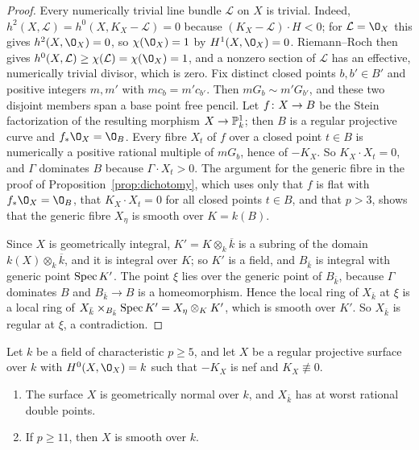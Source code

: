 \begin{proof}
Every numerically trivial line bundle $\mathcal L$ on $X$ is trivial.
Indeed, $h^2(X,\mathcal L) = h^0(X,K_X-\mathcal L) = 0$ because $(K_X-\mathcal L)\cdot H<0$; for $\mathcal L = \O_X$ this gives $h^2(X,\O_X) = 0$, so $\chi(\O_X) = 1$ by $H^1(X,\O_X) = 0$.
Riemann--Roch then gives $h^0(X,\mathcal L)\geq\chi(\mathcal L) = \chi(\O_X) = 1$, and a nonzero section of $\mathcal L$ has an effective, numerically trivial divisor, which is zero.
Fix distinct closed points $b,b'\in B'$ and positive integers $m,m'$ with $mc_b = m'c_{b'}$.
Then $mG_b\sim m'G_{b'}$, and these two disjoint members span a base point free pencil.
Let $f\colon X\to B$ be the Stein factorization of the resulting morphism $X\to\mathbb{P}^1_k$; then $B$ is a regular projective curve and $f_*\O_X = \O_B$.
Every fibre $X_t$ of $f$ over a closed point $t\in B$ is numerically a positive rational multiple of $mG_b$, hence of $-K_X$.
So $K_X\cdot X_t = 0$, and $\Gamma$ dominates $B$ because $\Gamma\cdot X_t>0$.
The argument for the generic fibre in the proof of Proposition~\ref{prop:dichotomy}, which uses only that $f$ is flat with $f_*\O_X = \O_B$, that $K_X\cdot X_t = 0$ for all closed points $t\in B$, and that $p>3$, shows that the generic fibre $X_\eta$ is smooth over $K = k(B)$.

Since $X$ is geometrically integral, $K' = K\otimes_k\overline k$ is a subring of the domain $k(X)\otimes_k\overline k$, and it is integral over $K$; so $K'$ is a field, and $B_{\bar k}$ is integral with generic point $\operatorname{Spec} K'$.
The point $\xi$ lies over the generic point of $B_{\bar k}$, because $\Gamma$ dominates $B$ and $B_{\bar k}\to B$ is a homeomorphism.
Hence the local ring of $X_{\bar k}$ at $\xi$ is a local ring of $X_{\bar k}\times_{B_{\bar k}}\operatorname{Spec} K' = X_\eta\otimes_KK'$, which is smooth over $K'$.
So $X_{\bar k}$ is regular at $\xi$, a contradiction.
\end{proof}

\begin{proposition}\label{prop:nef-nontrivial}
Let $k$ be a field of characteristic $p\geq 5$, and let $X$ be a regular projective surface over $k$ with $H^0(X,\O_X) = k$ such that $-K_X$ is nef and $K_X\not\equiv 0$.
\begin{enumerate}
\item The surface $X$ is geometrically normal over $k$, and $X_{\bar k}$ has at worst rational double points.
\item If $p\geq 11$, then $X$ is smooth over $k$.
\end{enumerate}
\end{proposition}

